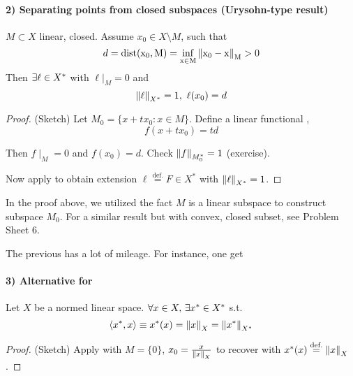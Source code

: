 \documentclass{article}
\begin{document}
\paragraph{2) Separating points from closed subspaces (Urysohn-type result)}

\begin{theorem}
\label{analog of Urysohn}
$M \subset X$ linear, closed. Assume $x_0 \in X\setminus M$, such that  
$$d = \rm{dist} (x_0, M) = \inf_{x \in M} \left\|{x_0-x}\right\|_M >0$$
Then $\exists \ell \in {X}^*$ with $\ell|_M=0$ and  
$$\left\|{\ell}\right\|_{{X}^*}=1, \  \ell(x_0)=d$$
\end{theorem}

\begin{proof}
(Sketch)
Let $M_0=\{x+t x_0: x\in M\}$. Define a linear functional , 
$$f(x+tx_0)=td$$

Then $f\mid_M=0$ and $f(x_0)=d$. Check $\left\|{f}\right\|_{M_0^*}=1$ (exercise).  

Now apply  to obtain extension $\ell \overset{\text{def.}}{=}F \in X^*$ with $\left\|{\ell}\right\|_{X^*}=1$.
\end{proof}

\begin{unexaminable}
\begin{remark}
    In the proof above, we utilized the fact $M$ is a linear subspace to construct subspace $M_0$. For a similar result but with convex, closed subset, see Problem Sheet 6.
\end{remark}
\end{unexaminable}

The previous  has a lot of mileage. For instance, one get  

\paragraph{3) Alternative for }  
\begin{proposition}
    Let $X$ be a normed linear space. $\forall x\in X,\,\exists x^*\in {X}^*$ s.t. $$\left<{{x}^*},{x}\right>\equiv{x}^*(x)=\left\|{x}\right\|_X=\left\|{{x}^*}\right\|_{{X}^*}$$
\end{proposition}
\begin{proof}
    (Sketch) Apply  with $M = \{0\}$, $x_0=\frac{x}{\left\|{x}\right\|_X}$ to recover  with $x^*(x) \stackrel{\text{def.}}{=} \left\|{x}\right\|_X$.
\end{proof}
\end{document}
